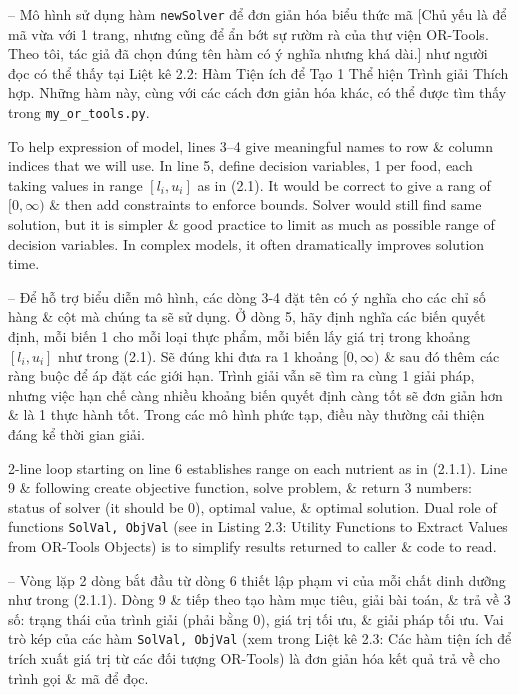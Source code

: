\documentclass{article}
\begin{document}
\begin{itemize}
\begin{itemize}
\begin{itemize}
            -- Mô hình sử dụng hàm {\tt newSolver} để đơn giản hóa biểu thức mã [Chủ yếu là để mã vừa với 1 trang, nhưng cũng để ẩn bớt sự rườm rà của thư viện OR-Tools. Theo tôi, tác giả đã chọn đúng tên hàm có ý nghĩa nhưng khá dài.] như người đọc có thể thấy tại {\sf Liệt kê 2.2: Hàm Tiện ích để Tạo 1 Thể hiện Trình giải Thích hợp}. Những hàm này, cùng với các cách đơn giản hóa khác, có thể được tìm thấy trong \verb|my_or_tools.py|.

            To help expression of model, lines 3--4 give meaningful names to row \& column indices that we will use. In line 5, define decision variables, 1 per food, each taking values in range $[l_i,u_i]$ as in (2.1). It would be correct to give a rang of $[0,\infty)$ \& then add constraints to enforce bounds. Solver would still find same solution, but it is simpler \& good practice to limit as much as possible range of decision variables. In complex models, it often dramatically improves solution time.

            -- Để hỗ trợ biểu diễn mô hình, các dòng 3-4 đặt tên có ý nghĩa cho các chỉ số hàng \& cột mà chúng ta sẽ sử dụng. Ở dòng 5, hãy định nghĩa các biến quyết định, mỗi biến 1 cho mỗi loại thực phẩm, mỗi biến lấy giá trị trong khoảng $[l_i,u_i]$ như trong (2.1). Sẽ đúng khi đưa ra 1 khoảng $[0,\infty)$ \& sau đó thêm các ràng buộc để áp đặt các giới hạn. Trình giải vẫn sẽ tìm ra cùng 1 giải pháp, nhưng việc hạn chế càng nhiều khoảng biến quyết định càng tốt sẽ đơn giản hơn \& là 1 thực hành tốt. Trong các mô hình phức tạp, điều này thường cải thiện đáng kể thời gian giải.

            2-line loop starting on line 6 establishes range on each nutrient as in (2.1.1). Line 9 \& following create objective function, solve problem, \& return 3 numbers: status of solver (it should be 0), optimal value, \& optimal solution. Dual role of functions {\tt SolVal, ObjVal} (see in {\sf Listing 2.3: Utility Functions to Extract Values from OR-Tools Objects}) is to simplify results returned to caller \& code to read.

            -- Vòng lặp 2 dòng bắt đầu từ dòng 6 thiết lập phạm vi của mỗi chất dinh dưỡng như trong (2.1.1). Dòng 9 \& tiếp theo tạo hàm mục tiêu, giải bài toán, \& trả về 3 số: trạng thái của trình giải (phải bằng 0), giá trị tối ưu, \& giải pháp tối ưu. Vai trò kép của các hàm {\tt SolVal, ObjVal} (xem trong {\sf Liệt kê 2.3: Các hàm tiện ích để trích xuất giá trị từ các đối tượng OR-Tools}) là đơn giản hóa kết quả trả về cho trình gọi \& mã để đọc.


\end{itemize}
\end{itemize}
\end{itemize}
\end{document}
